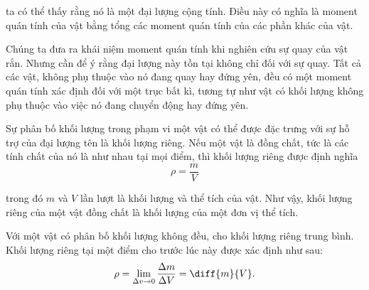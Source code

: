\noindent
ta có thể thấy rằng nó là một đại lượng cộng tính. Điều này có nghĩa là moment quán tính của vật bằng tổng các moment quán tính của các phần khác của vật.

Chúng ta đưa ra khái niệm moment quán tính khi nghiên cứu sự quay của vật rắn. Nhưng cần để ý rằng đại lượng này tồn tại không chỉ đối với sự quay. Tất cả các vật, không phụ thuộc vào nó đang quay hay đứng yên, đều có một moment quán tính xác định đối với một trục bất kì, tương tự như vật có khối lượng không phụ thuộc vào việc nó đang chuyển động hay đứng yên.

Sự phân bố khối lượng trong phạm vi một vật có thể được đặc trưng với sự hỗ trợ của đại lượng tên là khối lượng riêng. Nếu một vật là đồng chất, tức là các tính chất của nó là như nhau tại mọi điểm, thì khối lượng riêng được định nghĩa 
\begin{equation}\label{eq:5_17}
\rho = \frac{m}{V}
\end{equation}

\noindent
trong đó $m$ và $V$ lần lượt là khối lượng và thể tích của vật. Như vậy, khối lượng riêng của một vật đồng chất là khối lượng của một đơn vị thể tích.

Với một vật có phân bố khối lượng không đều,  cho khối lượng riêng trung bình. Khối lượng riêng tại một điểm cho trước lúc này được xác định như sau:
\begin{equation}\label{eq:5_18}
\rho = \lim_{\Delta v\to 0} \frac{\Delta m}{\Delta V} = \diff{m}{V}.
\end{equation}

